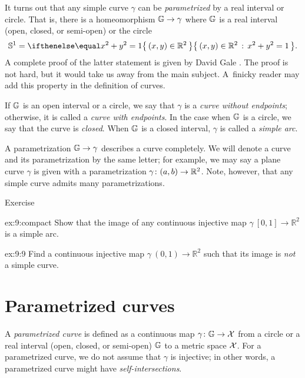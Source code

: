 It turns out that any simple curve $\gamma$ can be \emph{parametrized} by a real interval or circle.
That is, there is a homeomorphism $\mathbb{G}\to\gamma$ 
where $\mathbb{G}$ is a real interval (open, closed, or semi-open) or the circle
\[\mathbb{S}^1=\set{(x,y)\in\mathbb{R}^2}{x^2+y^2=1}.\] 
A complete proof of the latter statement is given by David Gale \cite{gale}.
The proof is not hard, but it would take us away from the main subject.
A~finicky reader may add this property in the definition of curves.

If $\mathbb{G}$ is an open interval or a circle, we say that $\gamma$ is a \emph{curve without endpoints}; otherwise, it is 
called a {}\emph{curve with endpoints}.
In the case when $\mathbb{G}$ is a circle, we say that the curve is \emph{closed}. 
When $\mathbb{G}$ is a closed interval, $\gamma$ is called a {}\emph{simple arc}.


A parametrization $\mathbb{G}\to\gamma$ describes a curve completely.
We will denote a curve and its parametrization by the same letter;
for example, we may say a plane curve $\gamma$ is given with a parametrization $\gamma\:(a,b)\z\to \mathbb{R}^2$.
Note, however, that any simple curve admits many parametrizations. 

\begin{thm}{Exercise}\label{ex:9}

\begin{subthm}{ex:9:compact}
Show that the image of any continuous injective map $\gamma\:[0,1]\to\mathbb{R}^2$ is a simple arc.
\end{subthm}

\begin{subthm}{ex:9:9}
Find a continuous injective map $\gamma\:(0,1)\to\mathbb{R}^2$ such that its image is \emph{not} a simple curve.
\end{subthm}

\end{thm}


\section{Parametrized curves}

A \emph{parametrized curve} is defined as a continuous map $\gamma\colon\mathbb{G}\to\mathcal{X}$ from a circle or a real interval (open, closed, or semi-open) $\mathbb{G}$ to a metric space $\mathcal{X}$. 
For a parametrized curve, we do not assume that $\gamma$ is injective; in other words, a parametrized curve might have \emph{self-intersections}.

